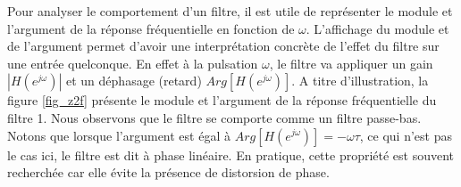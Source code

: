 \documentclass[11pt,a4paper]{IEEEtran}
\begin{document}
Pour analyser le comportement d'un filtre, il est utile de représenter le module et l'argument de la réponse fréquentielle en fonction de $\omega$. L'affichage du module et de l'argument permet d'avoir une interprétation concrète de l'effet du filtre sur une entrée quelconque. En effet à la pulsation $\omega$, le filtre va appliquer un gain $|H(e^{j\omega})|$ et un déphasage (retard) $Arg[H(e^{j\omega})]$. A titre d'illustration, la figure \ref{fig_z2f} présente le module et l'argument de la réponse fréquentielle du filtre 1. Nous observons que le filtre se comporte comme un filtre passe-bas. Notons que lorsque l'argument est égal à $Arg[H(e^{j\omega})]=-\omega \tau$, ce qui n'est pas le cas ici, le filtre est dit à phase linéaire. En pratique, cette propriété est souvent recherchée car elle évite la présence de distorsion de phase.
%
\end{document}
